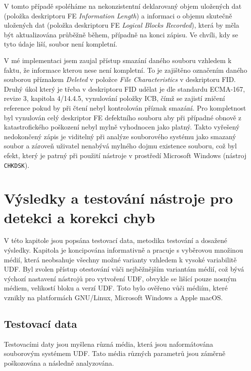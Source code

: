 V tomto případě spoléháme na nekonzistentní deklarovaný objem uložených dat (položka deskriptoru FE \textit{Information Length}) a informaci o objemu skutečně uložených dat (položka deskriptoru FE \textit{Logical Blocks Recorded}), která by měla být aktualizována průběžně během, případně na konci zápisu. Ve chvíli, kdy se tyto údaje liší, soubor není kompletní.

V mé implementaci jsem zaujal přístup smazání daného souboru vzhledem k faktu, že informace kterou nese není kompletní. To je zajištěno označením daného souborou příznakem \textit{Deleted} v položce \textit{File Characteristics} v deskriptoru FID. Druhý úkol který je třeba v deskriptoru FID udělat je dle standardu ECMA-167\cite{ecma-167}, revize 3, kapitola 4/14.4.5, vynulování položky ICB, čímž se zajistí zničení reference pokud by při čtení nebyl kontrolován příznak smazání. Pro kompletnost byl vynulován celý deskriptor FE defektního souboru aby při případné obnově z katastrofického poškození nebyl mylně vyhodnocen jako platný. Takto vyřešený nedokončený zápis je viditelný při analýze souborového systému jako smazaný soubor a zároveň uživatel nenabývá mylného dojmu existence souboru, což byl efekt, který je patrný při použití nástroje v prostředí Microsoft Windows (nástroj \texttt{CHKDSK}).

\chapter{Výsledky a testování nástroje pro detekci a korekci chyb}
\label{ch:results}
V této kapitole jsou popsána testovací data, metodika testování a dosažené výsledky. Kapitola je koncipována informativně a pracuje s vyběrovou množinou médií, která neobsahuje všechny možné varianty vzhledem k vysoké variabilitě UDF. Byl zvolen přístup otestování vůči nejběžnějším variantám médií, což bývá výchozí nastavení nástrojů pro vytvoření UDF, obvykle se lišící pouze nosným médiem, velikostí bloku a verzí UDF. Toto bylo ověřeno vůči médiím, které vznikly na platformách \mbox{GNU/Linux}, Microsoft Windows a Apple macOS. 

\section{Testovací data}
\label{sec:data}
Testovacími daty jsou myšlena různá média, která jsou naformátována souborovým systémem UDF. Tato média různých parametrů jsou záměrně poškozována a následně analyzována.

